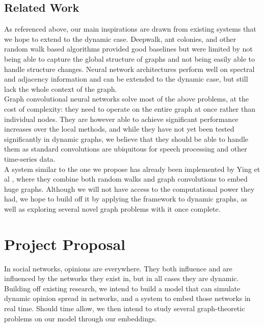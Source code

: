 \documentclass[10pt]{article}
\begin{document}
\subsection{Related Work}

As referenced above, our main inspirations are drawn from existing systems that we hope to extend to the dynamic case. Deepwalk, ant colonies, and other random walk based algorithms provided good baselines but were limited by not being able to capture the global structure of graphs and not being easily able to handle structure changes. Neural network architectures perform well on spectral and adjacency information and can be extended to the dynamic case, but still lack the whole context of the graph. \\

Graph convolutional neural networks solve most of the above problems, at the cost of complexity: they need to operate on the entire graph at once rather than individual nodes. They are however able to achieve significant performance increases over the local methods, and while they have not yet been tested significantly in dynamic graphs, we believe that they should be able to handle them as standard convolutions are ubiquitous for speech processing and other time-series data. \\

A system similar to the one we propose has already been implemented by Ying et al \cite{ying2018graph}, where they combine both random walks and graph convolutions to embed huge graphs. Although we will not have access to the computational power they had, we hope to build off it by applying the framework to dynamic graphs, as well as exploring several novel graph problems with it once complete. \\

\pagebreak

\section{Project Proposal}

In social networks, opinions are everywhere. They both influence and are influenced by the networks they exist in, but in all cases they are dynamic. Building off existing research, we intend to build a model that can simulate dynamic opinion spread in networks, and a system to embed those networks in real time. Should time allow, we then intend to study several graph-theoretic problems on our model through our embeddings. \\
\end{document}
